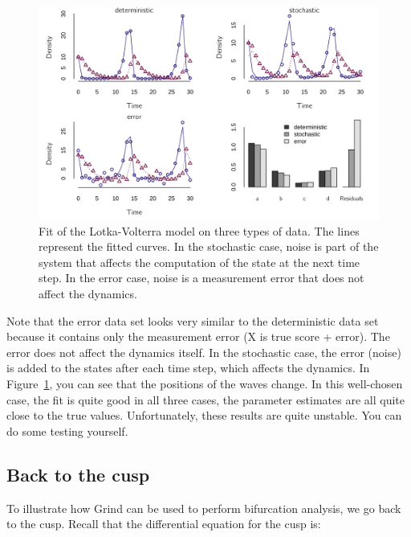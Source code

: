 \documentclass[
  a4paper,
  DIV=11,
  numbers=noendperiod,
  oneside]{scrreprt}
\begin{document}
\begin{figure}

{\centering \includegraphics{media/ch4n/fig-ch4n-img1-old-49.png}

}

\caption{\label{fig-ch4n-img1-old-49}Fit of the Lotka-Volterra model on
three types of data. The lines represent the fitted curves. In the
stochastic case, noise is part of the system that affects the
computation of the state at the next time step. In the error case, noise
is a measurement error that does not affect the dynamics.}

\end{figure}

Note that the error data set looks very similar to the deterministic
data set because it contains only the measurement error (X is true score
+ error). The error does not affect the dynamics itself. In the
stochastic case, the error (noise) is added to the states after each
time step, which affects the dynamics. In
Figure~\ref{fig-ch4n-img1-old-49}, you can see that the positions of the
waves change. In this well-chosen case, the fit is quite good in all
three cases, the parameter estimates are all quite close to the true
values. Unfortunately, these results are quite unstable. You can do some
testing yourself.

\hypertarget{sec-Back-to-the-cusp}{%
\subsection{Back to the cusp}\label{sec-Back-to-the-cusp}}

To illustrate how Grind can be used to perform bifurcation analysis, we
go back to the cusp. Recall that the differential equation for the cusp
is:
\end{document}
